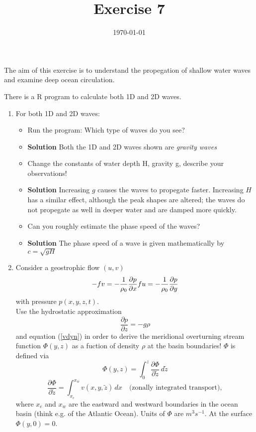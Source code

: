 \documentclass[a4paper,12pt]{article}
\title{Exercise 7}
\date{\today}
\begin{document}
\maketitle
\thispagestyle{fancy}

The aim of this exercise is to understand the propegation of shallow
water waves and examine deep ocean circulation.

There is a R program to calculate both 1D and 2D waves. 

\begin{enumerate}
\item For both 1D and 2D waves:
    \begin{itemize}
        \item Run the program: Which type of waves do you see?
        \item \textbf{Solution} Both the 1D and 2D waves shown are
          \textit{gravity waves}
        \item Change the constants of water depth H, gravity g,
          describe your observations!
          \item \textbf{Solution} Increasing $g$ causes the waves to
            propegate faster. Increasing $H$ has a similar effect,
            although the peak shapes are altered; the waves do not
            propegate as well in deeper water and are damped more quickly.
        \item Can you roughly estimate the phase speed of the waves?
          \item \textbf{Solution} The phase speed of a wave is given
            mathematically by $c = \sqrt{gH}$
    \end{itemize}

\item Consider a geostrophic flow $( u,  v) $
\begin{equation}
-f  v = - \frac{1}{\rho_0} \frac{\partial  p}{\partial x} \label{vdyn} \\
f  u = - \frac{1}{\rho_0} \frac{\partial  p}{\partial y} 
\end{equation}
with pressure $ p (x,y,z,t)$. \\
Use the hydrostatic approximation 
\begin{equation}
 \frac{\partial  p}{\partial z} = -g \rho
 \end{equation}
 and equation (\ref{vdyn}) in order to derive the meridional overturning stream function $\Phi(y,z)$ as a fuction of density $\rho$ at the basin boundaries! 
$\Phi$ is defined via 
\begin{equation}
\Phi(y,z) = \int_{0}^{z} \frac{\partial  \Phi}{\partial \tilde z} \,d
\tilde z
\end{equation}
\begin{equation}
\frac{\partial  \Phi}{\partial \tilde z} = \int_{x_e}^{x_w} v(x,y,\tilde z) \, dx  \quad \mbox{(zonally integrated transport)}, 
\end{equation}
where $ x_e $ and $ x_w $ are the eastward and westward boundaries in
the ocean basin (think e.g. of the Atlantic Ocean). Units of $\Phi$
are $m^3 s^{-1}$. At the surface $\Phi(y,0)=0$.


\end{enumerate}
\end{document}
